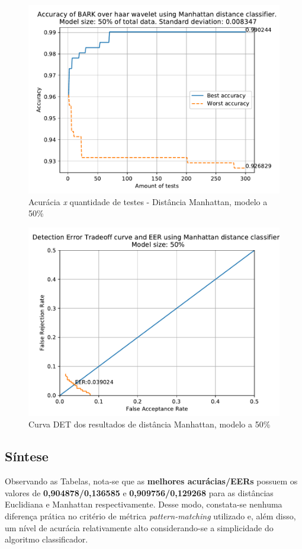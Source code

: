 			\begin{figure}[H]
				\centering
				\includegraphics[width=.9\linewidth]{images/results/confusionMatrices/classifier_Manhattan_50}
				\caption{Acurácia \textit{x} quantidade de testes - Distância Manhattan, modelo a 50\%}
				\label{fig:classifiermanhattan50}
			\end{figure}
	
			\begin{figure}[H]
				\centering
				\includegraphics[width=.9\linewidth]{images/results/det/DET_for_classifier_Manhattan_50}
				\caption{Curva DET dos resultados de distância Manhattan, modelo a 50\%}
				\label{fig:detforclassifiermanhattan50}
			\end{figure}

		\subsection{Síntese}
			\par Observando as Tabelas, nota-se que as \textbf{melhores acurácias/EERs} possuem os valores de \textbf{0,904878/0,136585} e \textbf{0,909756/0,129268} para as distâncias Euclidiana e Manhattan respectivamente. Desse modo, constata-se nenhuma diferença prática no critério de métrica \textit{pattern-matching} utilizado e, além disso, um nível de acurácia relativamente alto considerando-se a simplicidade do algoritmo classificador.

